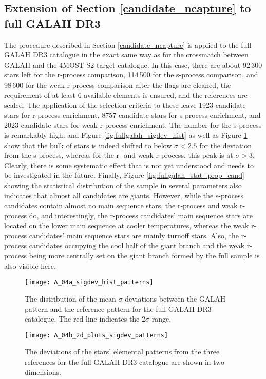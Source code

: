 \documentclass[a4paper,11pt]{article}
\begin{document}
\subsection{Extension of Section \ref{candidate_ncapture} to full GALAH DR3}\label{pattern_fullgalah}
The procedure described in Section \ref{candidate_ncapture} is applied to the full GALAH DR3 catalogue in the exact same way as for the crossmatch between GALAH and the 4MOST S2 target catalogue. In this case, there are about 92\,300 stars left for the r-process comparison, 114\,500 for the s-process comparison, and 98\,600 for the weak r-process comparison after the flags are cleaned, the requirement of at least 6 available elements is ensured, and the references are scaled. The application of the selection criteria to these leave 1923 candidate stars for r-process-enrichment, 8757 candidate stars for s-process-enrichment, and 2023 candidate stars for weak-r-process-enrichment. The number for the s-process is remarkably high, and Figure \ref{fig:fullgalah_sigdev_hist} as well as Figure \ref{fig:fullgalah_sigdev_2d} show that the bulk of stars is indeed shifted to below $\sigma<2.5$ for the deviation from the s-process, whereas for the r- and weak-r process, this peak is at $\sigma>3$. Clearly, there is some systematic effect that is not yet understood and needs to be investigated in the future. Finally, Figure \ref{fig:fullgalah_stat_prop_cand} showing the statistical distribution of the sample in several parameters also indicates that almost all candidates are giants. However, while the s-process candidates contain almost no main sequence stars, the r-process and weak r-process do, and interestingly, the r-process candidates' main sequence stars are located on the lower main sequence at cooler temperatures, whereas the weak r-process candidates' main sequence stars are mainly turnoff stars. Also, the r-process candidates occupying the cool half of the giant branch and the weak r-process being more centrally set on the giant branch formed by the full sample is also visible here.
%
\begin{figure}[ht]
 \begin{minipage}[t]{\textwidth}
 \centering
 \texttt{[image: A\_04a\_sigdev\_hist\_patterns]}
 \caption[Mean $\sigma$-deviations from references for full GALAH DR3]{The distribution of the mean $\sigma$-deviations between the GALAH pattern and the reference pattern for the full GALAH DR3 catalogue. The red line indicates the $2\sigma$-range.}
 \label{fig:fullgalah_sigdev_hist}
 \end{minipage}
 \begin{minipage}[t]{\textwidth}
 \centering
 \texttt{[image: A\_04b\_2d\_plots\_sigdev\_patterns]}
 \caption[2D plot of deviations from references for full GALAH DR3]{The deviations of the stars' elemental patterns from the three references for the full GALAH DR3 catalogue are shown in two dimensions.}
 \label{fig:fullgalah_sigdev_2d}
 \end{minipage}
\end{figure}
\end{document}
